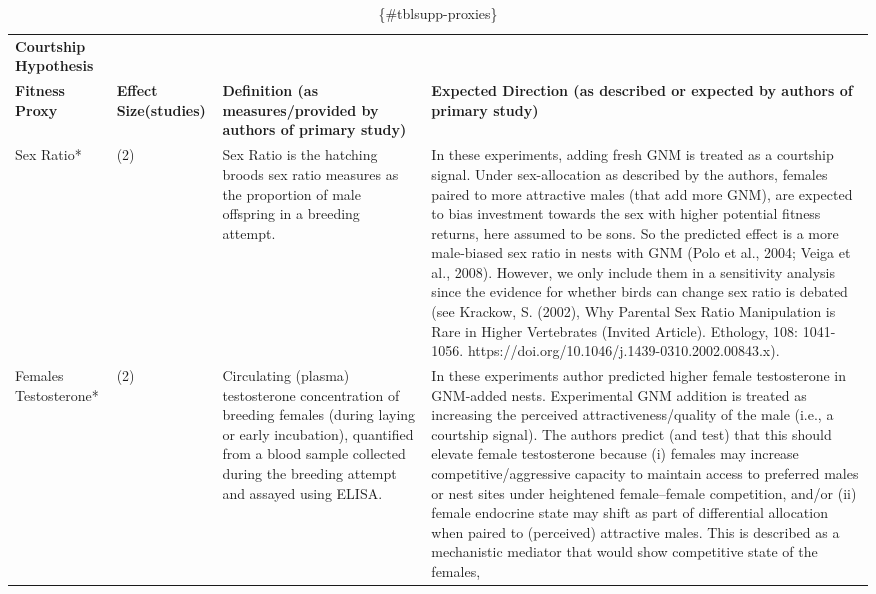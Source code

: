 \documentclass[
  number,
  review,
  onecolumn]{elsarticle}
\begin{document}
\begin{longtable}[]{@{}
  >{\raggedright\arraybackslash}p{}
  >{\centering\arraybackslash}p{}
  >{\raggedright\arraybackslash}p{}
  >{\raggedright\arraybackslash}p{}@{}}
\caption{ \{\#tblsupp-proxies\}}\tabularnewline
\toprule\noalign{}
\endfirsthead
\endhead
\bottomrule\noalign{}
\endlastfoot
\textbf{Courtship Hypothesis} & & & \\
\textbf{Fitness Proxy} & \textbf{Effect Size(studies)} &
\textbf{Definition (as measures/provided by authors of primary study)} &
\textbf{Expected Direction (as described or expected by authors of
primary study)} \\
Sex Ratio* & 9(2) & Sex Ratio is the hatching broods sex ratio measures
as the proportion of male offspring in a breeding attempt. & In these
experiments, adding fresh GNM is treated as a courtship signal. Under
sex-allocation as described by the authors, females paired to more
attractive males (that add more GNM), are expected to bias investment
towards the sex with higher potential fitness returns, here assumed to
be sons. So the predicted effect is a more male-biased sex ratio in
nests with GNM (Polo et al., 2004; Veiga et al., 2008). However, we only
include them in a sensitivity analysis since the evidence for whether
birds can change sex ratio is debated (see Krackow, S. (2002), Why
Parental Sex Ratio Manipulation is Rare in Higher Vertebrates (Invited
Article). Ethology, 108: 1041-1056.
https://doi.org/10.1046/j.1439-0310.2002.00843.x). \\
Females Testosterone* & 4(2) & Circulating (plasma) testosterone
concentration of breeding females (during laying or early incubation),
quantified from a blood sample collected during the breeding attempt and
assayed using ELISA. & In these experiments author predicted higher
female testosterone in GNM-added nests. Experimental GNM addition is
treated as increasing the perceived attractiveness/quality of the male
(i.e., a courtship signal). The authors predict (and test) that this
should elevate female testosterone because (i) females may increase
competitive/aggressive capacity to maintain access to preferred males or
nest sites under heightened female--female competition, and/or (ii)
female endocrine state may shift as part of differential allocation when
paired to (perceived) attractive males. This is described as a
mechanistic mediator that would show competitive state of the females,

\end{longtable}
\end{document}
